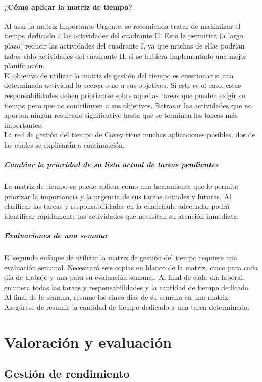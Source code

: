 \documentclass[10pt]{book}
\begin{document}
\subsubsection{¿Cómo aplicar la matriz de tiempo?}
Al usar la matriz Importante-Urgente, se recomienda tratar de maximizar el tiempo dedicado a las actividades del cuadrante II. Esto le permitirá (a largo plazo) reducir las actividades del cuadrante I, ya que muchas de ellas podrían haber sido actividades del cuadrante II, si se hubiera implementado una mejor planificación.\\
El objetivo de utilizar la matriz de gestión del tiempo es cuestionar si una determinada actividad lo acerca o no a sus objetivos. Si este es el caso, estas responsabilidades deben priorizarse sobre aquellas tareas que pueden exigir su tiempo pero que no contribuyen a sus objetivos. Retrasar las actividades que no aportan ningún resultado significativo hasta que se terminen las tareas más importantes.\\
La red de gestión del tiempo de Covey tiene muchas aplicaciones posibles, dos de las cuales se explicarán a continuación.
\paragraph{Cambiar la prioridad de su lista actual de tareas pendientes}
La matriz de tiempo se puede aplicar como una herramienta que le permite priorizar la importancia y la urgencia de sus tareas actuales y futuras. Al clasificar las tareas y responsabilidades en la cuadrícula adecuada, podrá identificar rápidamente las actividades que necesitan su atención inmediata.
\paragraph{Evaluaciones de una semana}
El segundo enfoque de utilizar la matriz de gestión del tiempo requiere una evaluación semanal. Necesitará seis copias en blanco de la matriz, cinco para cada día de trabajo y una para su evaluación semanal. Al final de cada día laboral, enumera todas las tareas y responsabilidades y la cantidad de tiempo dedicado. Al final de la semana, resume los cinco días de su semana en una matriz. Asegúrese de resumir la cantidad de tiempo dedicado a una tarea determinada.


\chapter{Valoración y evaluación}
\section{Gestión de rendimiento}
\end{document}
